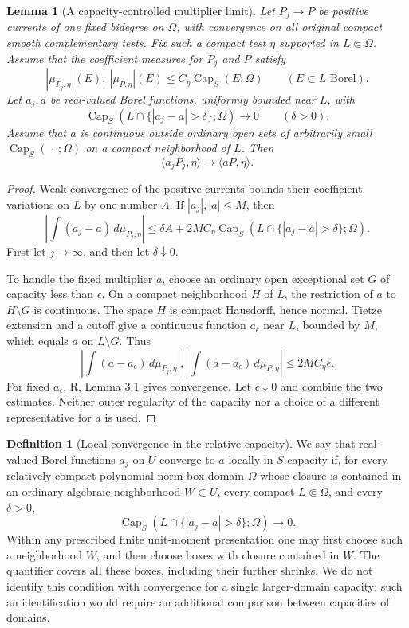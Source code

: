 \documentclass[11pt,a4paper]{article}
\numberwithin{equation}{section}
\newtheorem{lemma}[theorem]{Lemma}
\theoremstyle{definition}
\newtheorem{definition}[theorem]{Definition}
\theoremstyle{remark}
\begin{document}
\begin{lemma}[A capacity-controlled multiplier limit]
\label{lem:capacity-multiplier}
Let $P_j\to P$ be positive currents of one fixed bidegree on $\Omega$,
with convergence on all original compact smooth complementary tests.
Fix such a compact test $\eta$ supported in $L\Subset\Omega$.
Assume that the coefficient measures for $P_j$ and $P$ satisfy
\[
 |\mu_{P_j,\eta}|(E),\ |\mu_{P,\eta}|(E)
       \leq C_\eta\operatorname{Cap}_S(E;\Omega)
       \qquad(E\subset L\text{ Borel}).
\]
Let $a_j,a$ be real-valued Borel functions, uniformly bounded near $L$, with
\[
 \operatorname{Cap}_S(L\cap\{|a_j-a|>\delta\};\Omega)
       \longrightarrow0\qquad(\delta>0).
\]
Assume that $a$ is continuous outside ordinary open sets of arbitrarily
small $\operatorname{Cap}_S(\,\cdot\,;\Omega)$ on a compact
neighborhood of $L$. Then
\[
 \langle a_jP_j,\eta\rangle\longrightarrow\langle aP,\eta\rangle.
\]
\end{lemma}

\begin{proof}
Weak convergence of the positive currents bounds their coefficient
variations on $L$ by one number $A$. If $|a_j|,|a|\leq M$, then
\[
 \left|\int(a_j-a)\,d\mu_{P_j,\eta}\right|
 \leq \delta A+2MC_\eta
       \operatorname{Cap}_S(L\cap\{|a_j-a|>\delta\};\Omega).
\]
First let $j\to\infty$, and then let $\delta\downarrow0$.

To handle the fixed multiplier $a$, choose an ordinary open exceptional
set $G$ of capacity less than $\epsilon$. On a compact neighborhood
$H$ of $L$, the restriction of $a$ to $H\setminus G$ is continuous.
The space $H$ is compact Hausdorff, hence normal. Tietze extension and
a cutoff give a continuous function $a_\epsilon$ near $L$, bounded
by $M$, which equals $a$ on $L\setminus G$. Thus
\[
 \left|\int(a-a_\epsilon)\,d\mu_{P_j,\eta}\right|,
 \left|\int(a-a_\epsilon)\,d\mu_{P,\eta}\right|
 \leq 2MC_\eta\epsilon.
\]
For fixed $a_\epsilon$, R, Lemma 3.1 gives convergence. Let
$\epsilon\downarrow0$ and combine the two estimates. Neither outer
regularity of the capacity nor a choice of a different representative
for $a$ is used.
\end{proof}

\begin{definition}[Local convergence in the relative capacity]
\label{def:local-capacity-convergence}
We say that real-valued Borel functions $a_j$ on $U$ converge to $a$ locally in
$S$-capacity if, for every relatively compact polynomial norm-box
domain $\Omega$ whose closure is contained in an ordinary algebraic
neighborhood $W\subset U$, every compact $L\Subset\Omega$, and
every $\delta>0$,
\[
 \operatorname{Cap}_S(L\cap\{|a_j-a|>\delta\};\Omega)
       \longrightarrow0.
\]
Within any prescribed finite unit-moment presentation one may first
choose such a neighborhood $W$, and then choose boxes with closure
contained in $W$. The quantifier covers all these boxes, including
their further shrinks. We do not identify this condition with
convergence for a single larger-domain capacity: such an identification
would require an additional comparison between capacities of domains.
\end{definition}
\end{document}
